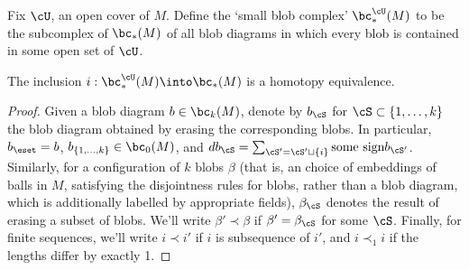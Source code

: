 
Fix $\cU$, an open cover of $M$. Define the `small blob complex' $\bc^{\cU}_*(M)$ to be the subcomplex of $\bc_*(M)$ of all blob diagrams in which every blob is contained in some open set of $\cU$.

\begin{lem}
The inclusion $i: \bc^{\cU}_*(M) \into \bc_*(M)$ is a homotopy equivalence.
\end{lem}
\begin{proof}
Given a blob diagram $b \in \bc_k(M)$, denote by $b_\cS$ for $\cS \subset \{1, \ldots, k\}$ the blob diagram obtained by erasing the corresponding blobs. In particular, $b_\eset = b$, $b_{\{1,\ldots,k\}} \in \bc_0(M)$, and $d b_\cS = \sum_{\cS' = \cS'\sqcup\{i\}} \text{some sign} b_{\cS'}$.
Similarly, for a configuration of $k$ blobs $\beta$ (that is, an choice of embeddings of balls in $M$, satisfying the disjointness rules for blobs, rather than a blob diagram, which is additionally labelled by appropriate fields), $\beta_\cS$ denotes the result of erasing a subset of blobs. We'll write $\beta' \prec \beta$ if $\beta' = \beta_\cS$ for some $\cS$. Finally, for finite sequences, we'll write $i \prec i'$ if $i$ is subsequence of $i'$, and $i \prec_1 i$ if the lengths differ by exactly 1.


\end{proof}
